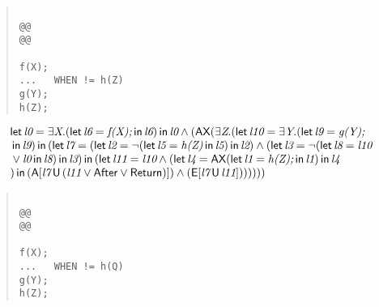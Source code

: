 \documentclass{article}
\newcommand{\U}{\,\mbox{\sf{U}}\,}
\newcommand{\A}{\mbox{\sf{A}}}
\newcommand{\E}{\mbox{\sf{E}}}
\newcommand{\AX}{\mbox{\sf{AX}}}
\newcommand{\mita}[1]{\mbox{\it{{#1}}}}
\newcommand{\msf}[1]{\mbox{\sf{{#1}}}}
\begin{document}
\begin{quote}\begin{verbatim}

@@
@@

f(X);
...   WHEN != h(Z)
g(Y);
h(Z);
\end{verbatim}\end{quote}

\[\begin{array}{l}
\mita{\sf{let}} \, \mita{l0} = \exists \mita{X} . (\mita{\sf{let}} \, \mita{l6} = \mita{f(X);} \, \mita{\sf{in}} \, \mita{l6}
) \, \mita{\sf{in}} \, \mita{l0} \wedge (\AX(\exists \mita{Z} . (\mita{\sf{let}} \, \mita{l10} = \exists \mita{Y} . (\mita{\sf{let}} \, \mita{l9} = \mita{g(Y);}\\\mbox{} \, \mita{\sf{in}} \, \mita{l9}
) \, \mita{\sf{in}} \, (\mita{\sf{let}} \, \mita{l7} = (\mita{\sf{let}} \, \mita{l2} = \neg (\mita{\sf{let}} \, \mita{l5} = \mita{h(Z)} \, \mita{\sf{in}} \, \mita{l5}
) \, \mita{\sf{in}} \, \mita{l2}
) \wedge (\mita{\sf{let}} \, \mita{l3} = \neg (\mita{\sf{let}} \, \mita{l8} = \mita{l10}\\\mbox{} \vee \mita{l0} \, \mita{\sf{in}} \, \mita{l8}
) \, \mita{\sf{in}} \, \mita{l3}
) \, \mita{\sf{in}} \, (\mita{\sf{let}} \, \mita{l11} = \mita{l10} \wedge (\mita{\sf{let}} \, \mita{l4} = \AX(\mita{\sf{let}} \, \mita{l1} = \mita{h(Z);} \, \mita{\sf{in}} \, \mita{l1}
) \, \mita{\sf{in}} \, \mita{l4}\\\mbox{}
) \, \mita{\sf{in}} \, (\A[\mita{l7} \U (\mita{l11} \vee \msf{After} \vee \msf{Return})]
) \wedge (\E[\mita{l7} \U \mita{l11}]
)
)
)
)))

\end{array}\]

\begin{quote}\begin{verbatim}

@@
@@

f(X);
...   WHEN != h(Q)
g(Y);
h(Z);
\end{verbatim}\end{quote}
\end{document}
